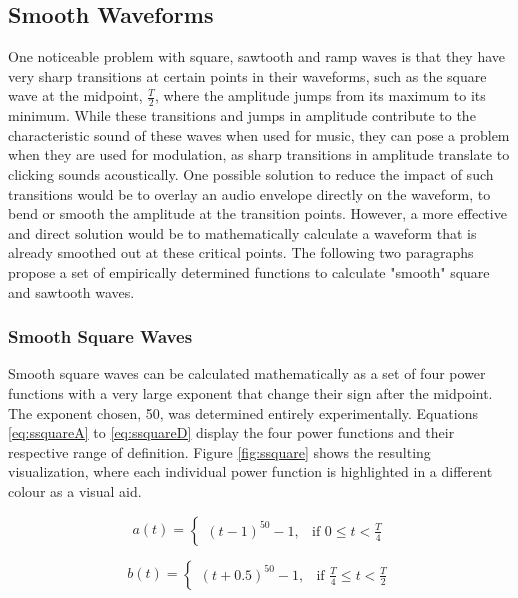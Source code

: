 \documentclass[12pt,twoside]{report}
\begin{document}
\subsection{Smooth Waveforms}

One noticeable problem with square, sawtooth and ramp waves is that they have very sharp transitions at certain points in their waveforms, such as the square wave at the midpoint, $\frac{T}{2}$, where the amplitude jumps from its maximum to its minimum. While these transitions and jumps in amplitude contribute to the characteristic sound of these waves when used for music, they can pose a problem when they are used for modulation, as sharp transitions in amplitude translate to clicking sounds acoustically. One possible solution to reduce the impact of such transitions would be to overlay an audio envelope directly on the waveform, to bend or smooth the amplitude at the transition points. However, a more effective and direct solution would be to mathematically calculate a waveform that is already smoothed out at these critical points. The following two paragraphs propose a set of empirically determined functions to calculate "smooth" square and sawtooth waves.

\subsubsection{Smooth Square Waves}

Smooth square waves can be calculated mathematically as a set of four power functions with a very large exponent that change their sign after the midpoint. The exponent chosen, 50, was determined entirely experimentally. Equations \ref{eq:ssquareA} to \ref{eq:ssquareD} display the four power functions and their respective range of definition. Figure \ref{fig:ssquare} shows the resulting visualization, where each individual power function is highlighted in a different colour as a visual aid.

\begin{equation}
  a(t) =
  \begin{cases}
    (t - 1)^{50} - 1,& \text{if } 0 \leq t < \frac{T}{4}
  \end{cases}
  \label{eq:ssquareA}
\end{equation}

\begin{equation}
  b(t) =
  \begin{cases}
    (t + 0.5)^{50} - 1,& \text{if } \frac{T}{4} \leq t < \frac{T}{2}
  \end{cases}
  \label{eq:ssquareB}
\end{equation}
\end{document}
